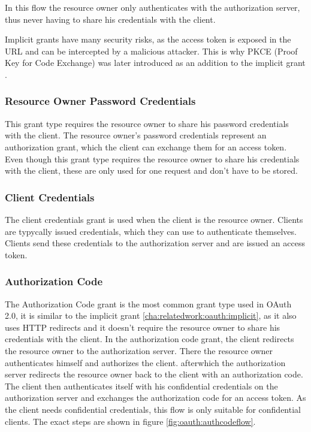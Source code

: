 In this flow the resource owner only authenticates with the authorization server,
thus never having to share his credentials with the client.

Implicit grants have many security risks, as the access token is exposed in the URL and can be intercepted by a malicious attacker.
This is why PKCE (Proof Key for Code Exchange) was later introduced as an addition to the implicit grant \cite{rfcPkce}.

\subsubsection{Resource Owner Password Credentials}
\label{cha:relatedwork:oauth:passwordcredentials}

This grant type requires the resource owner to share his password credentials with the client.
The resource owner's password credentials represent an authorization grant,
which the client can exchange them for an access token.
Even though this grant type requires the resource owner to share his credentials with the client,
these are only used for one request and don't have to be stored.


\subsubsection{Client Credentials}
\label{cha:relatedwork:oauth:cleintcredentials}

The client credentials grant is used when the client is the resource owner.
Clients are typycally issued credentials, which they can use to authenticate themselves.
Clients send these credentials to the authorization server and are issued an access token.

\subsubsection{Authorization Code}
\label{cha:relatedwork:oauth:authcode}

The Authorization Code grant is the most common grant type used in OAuth 2.0,
it is similar to the implicit grant \ref{cha:relatedwork:oauth:implicit}, as it also uses HTTP redirects and it doesn't require the resource owner to share his credentials with the client.
In the authorization code grant, the client redirects the resource owner to the authorization server.
There the resource owner authenticates himself and authorizes the client.
afterwhich the authorization server redirects the resource owner back to the client with an authorization code.
The client then authenticates itself with his confidential credentials on the authorization server and exchanges the authorization code for an access token.
As the client needs confidential credentials, this flow is only suitable for confidential clients.
The exact steps are shown in figure \ref{fig:oauth:authcodeflow}.


